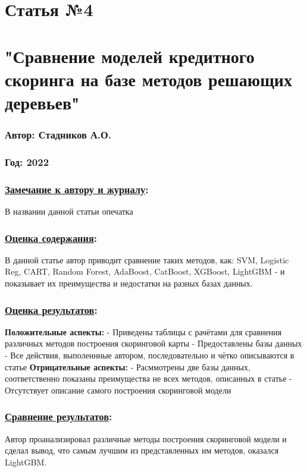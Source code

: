 \documentclass[a4paper,14pt]{article}
\begin{document}
\newpage

\section*{Статья №4}
\section*{"Сравнение моделей кредитного скоринга на базе методов решающих деревьев"}
\subsubsection*{Автор: Стадников А.О.}
\subsubsection*{Год: 2022}
\subsubsection*{\underline{Замечание к автору и журналу}:}
В названии данной статьи опечатка
\subsubsection*{\underline{Оценка содержания}:}
В данной статье автор приводит сравнение таких методов, как: SVM, Logistic Reg, CART, Random Forest, AdaBoost, CatBoost, XGBoost, LightGBM - и показывает их преимущества и недостатки на разных базах данных.
\subsubsection*{\underline{Оценка результатов}:}
\textbf{Положительные аспекты:} \newline
- Приведены таблицы с рачётами для сравнения различных методов построения скоринговой карты \newline
- Предоставлены базы данных \newline
- Все действия, выполеннные автором, последовательно и чётко описываются в статье \newline
\textbf{Отрицательные аспекты:} \newline
- Расммотрены две базы данных, соответственно показаны преимущества не всех методов, описанных в статье \newline
- Отсутствует описание самого построения скоринговой модели \newline
\subsubsection*{\underline{Сравнение результатов}:}
Автор проанализировал различные методы построения скоринговой модели и сделал вывод, что самым лучшим из представленных им методов, оказался LightGBM.
\end{document}
